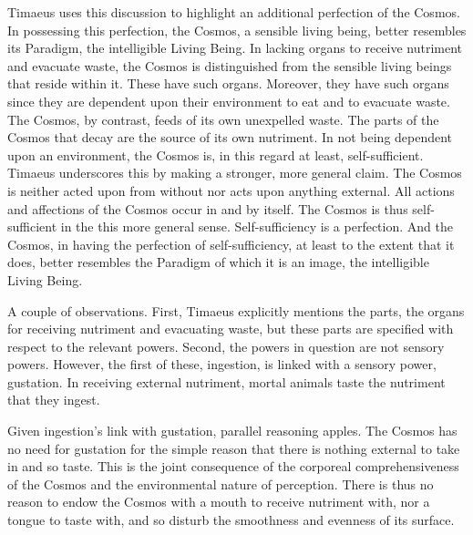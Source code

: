 Timaeus uses this discussion to highlight an additional perfection of the Cosmos. In possessing this perfection, the Cosmos, a sensible living being, better resembles its Paradigm, the intelligible Living Being. In lacking organs to receive nutriment and evacuate waste, the Cosmos is distinguished from the sensible living beings that reside within it. These have such organs. Moreover, they have such organs since they are dependent upon their environment to eat and to evacuate waste. The Cosmos, by contrast, feeds of its own unexpelled waste. The parts of the Cosmos that decay are the source of its own nutriment. In not being dependent upon an environment, the Cosmos is, in this regard at least, self-sufficient. Timaeus underscores this by making a stronger, more general claim. The Cosmos is neither acted upon from without nor acts upon anything external. All actions and affections of the Cosmos occur in and by itself. The Cosmos is thus self-sufficient in the this more general sense. Self-sufficiency is a perfection. And the Cosmos, in having the perfection of self-sufficiency, at least to the extent that it does, better resembles the Paradigm of which it is an image, the intelligible Living Being.

A couple of observations. First, Timaeus explicitly mentions the parts, the organs for receiving nutriment and evacuating waste, but these parts are specified with respect to the relevant powers. Second, the powers in question are not sensory powers. However, the first of these, ingestion, is linked with a sensory power, gustation. In receiving external nutriment, mortal animals taste the nutriment that they ingest. 

Given ingestion's link with gustation, parallel reasoning apples. The Cosmos has no need for gustation for the simple reason that there is nothing external to take in and so taste. This is the joint consequence of the corporeal comprehensiveness of the Cosmos and the environmental nature of perception. There is thus no reason to endow the Cosmos with a mouth to receive nutriment with, nor a tongue to taste with, and so disturb the smoothness and evenness of its surface.

